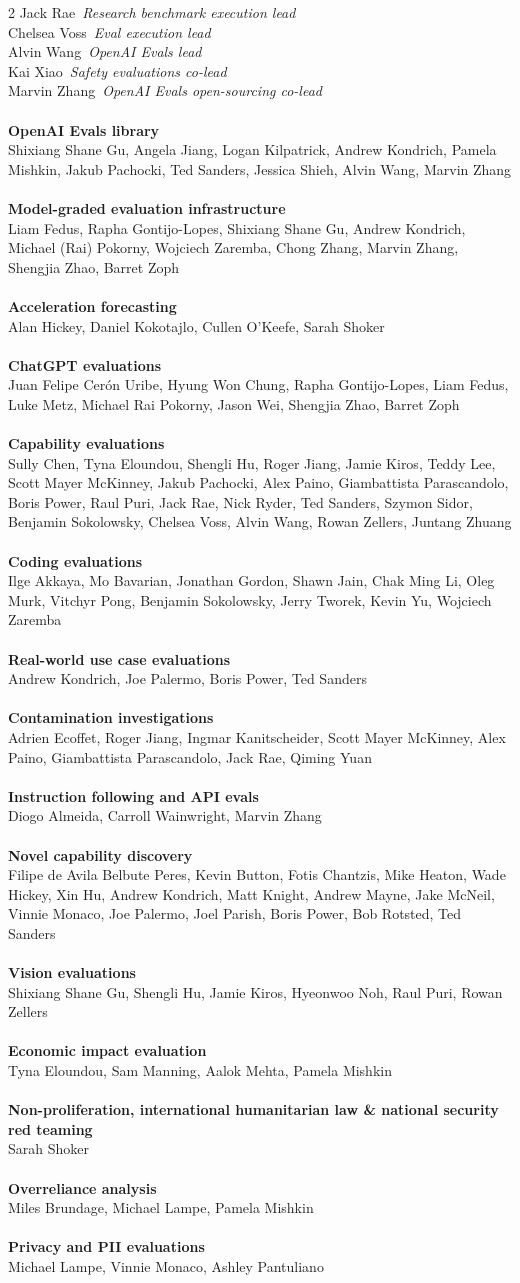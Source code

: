 \documentclass{article}
\newcommand{\creditlistheader}[1]{\textbf{#1}\footnotemark[\thefootnote]\\}
\newcommand{\creditlist}[2]{\creditlistheader{#1}#2\\
\\}
\newcommand{\corecontributor}[2]{#1\ \textit{#2}\\}
\begin{document}
\begin{multicols}{2}
\corecontributor{Jack Rae}{Research benchmark execution lead}
\corecontributor{Chelsea Voss}{Eval execution lead}
\corecontributor{Alvin Wang}{OpenAI Evals lead}
\corecontributor{Kai Xiao}{Safety evaluations co-lead}
\corecontributor{Marvin Zhang}{OpenAI Evals open-sourcing co-lead}
\\
\creditlist{OpenAI Evals library}{Shixiang Shane Gu, Angela Jiang, Logan Kilpatrick, Andrew Kondrich, Pamela Mishkin, Jakub Pachocki, Ted Sanders, Jessica Shieh, Alvin Wang, Marvin Zhang}
\creditlist{Model-graded evaluation infrastructure}{Liam Fedus, Rapha Gontijo-Lopes, Shixiang Shane Gu, Andrew Kondrich, Michael (Rai) Pokorny, Wojciech Zaremba, Chong Zhang, Marvin Zhang, Shengjia Zhao, Barret Zoph}
\creditlist{Acceleration forecasting}{Alan Hickey, Daniel Kokotajlo, Cullen O'Keefe, Sarah Shoker}
\creditlist{ChatGPT evaluations}{Juan Felipe Cer\'on Uribe, Hyung Won Chung, Rapha Gontijo-Lopes, Liam Fedus, Luke Metz, Michael Rai Pokorny, Jason Wei, Shengjia Zhao, Barret Zoph}
\creditlist{Capability evaluations}{Sully Chen, Tyna Eloundou, Shengli Hu, Roger Jiang, Jamie Kiros, Teddy Lee, Scott Mayer McKinney, Jakub Pachocki, Alex Paino, Giambattista Parascandolo, Boris Power, Raul Puri, Jack Rae, Nick Ryder, Ted Sanders, Szymon Sidor, Benjamin Sokolowsky, Chelsea Voss, Alvin Wang, Rowan Zellers, Juntang Zhuang}
\creditlist{Coding evaluations}{Ilge Akkaya, Mo Bavarian, Jonathan Gordon, Shawn Jain, Chak Ming Li, Oleg Murk, Vitchyr Pong, Benjamin Sokolowsky, Jerry Tworek, Kevin Yu, Wojciech Zaremba}
\creditlist{Real-world use case evaluations}{Andrew Kondrich, Joe Palermo, Boris Power, Ted Sanders}
\creditlist{Contamination investigations}{Adrien Ecoffet, Roger Jiang, Ingmar Kanitscheider, Scott Mayer McKinney, Alex Paino, Giambattista Parascandolo, Jack Rae, Qiming Yuan}
\creditlist{Instruction following and API evals}{Diogo Almeida, Carroll Wainwright, Marvin Zhang}
\creditlist{Novel capability discovery}{Filipe de Avila Belbute Peres, Kevin Button, Fotis Chantzis, Mike Heaton, Wade Hickey, Xin Hu, Andrew Kondrich, Matt Knight, Andrew Mayne, Jake McNeil, Vinnie Monaco, Joe Palermo, Joel Parish, Boris Power, Bob Rotsted, Ted Sanders}
\creditlist{Vision evaluations}{Shixiang Shane Gu, Shengli Hu, Jamie Kiros, Hyeonwoo Noh, Raul Puri, Rowan Zellers}
\creditlist{Economic impact evaluation}{Tyna Eloundou, Sam Manning, Aalok Mehta, Pamela Mishkin}
\creditlist{Non-proliferation, international humanitarian law \& national security red teaming}{Sarah Shoker}
\creditlist{Overreliance analysis}{Miles Brundage, Michael Lampe, Pamela Mishkin}
\creditlist{Privacy and PII evaluations}{Michael Lampe, Vinnie Monaco, Ashley Pantuliano}

\end{multicols}
\end{document}
